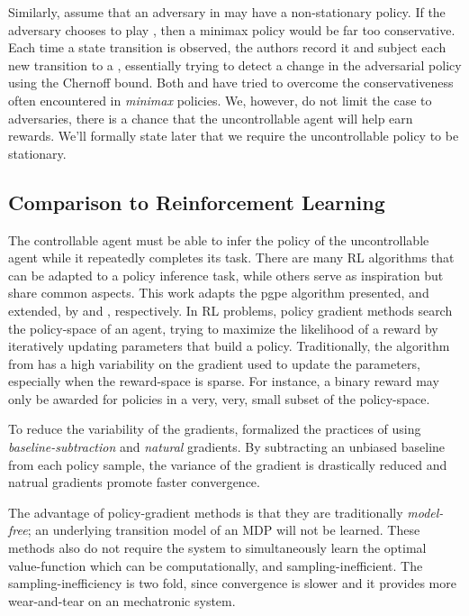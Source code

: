     Similarly, \cite{lim2013reinforcement} assume that an adversary in  may have a non-stationary policy. If
    the adversary chooses to play , then a minimax policy would be far too conservative. Each
    time a state transition is observed, the authors record it and subject each new transition to a
    , essentially trying to detect a change in the adversarial policy using the
    Chernoff bound. Both \cite{lim2013reinforcement} and \cite{bertuccelli2012robust} have tried to overcome the
    conservativeness often encountered in \textit{minimax} policies. We, however, do not limit the case to adversaries,
    there is a chance that the uncontrollable agent will help earn rewards. We'll formally state later that we require
    the uncontrollable policy to be stationary.

\subsection{Comparison to Reinforcement Learning}
    The controllable agent must be able to infer the policy of the uncontrollable agent while it repeatedly completes
    its task. There are many \ac{RL} algorithms that can be adapted to a policy inference task, while others serve as
    inspiration but share common aspects. This work adapts the \ac{pgpe} algorithm presented, and extended, by
    \cite{sehnke2010parameter} and \cite{tangkaratt2014model}, respectively. In \ac{RL} problems, policy gradient
    methods search the policy-space of an agent, trying to maximize the likelihood of a reward by iteratively updating
    parameters that build a policy. Traditionally, the \reinforce algorithm from \cite{williams1992simple} has a high
    variability on the gradient used to update the parameters, especially when the reward-space is sparse. For instance,
    a binary reward may only be awarded for policies in a very, very, small subset of the policy-space.

    To reduce the variability of the gradients, \cite{peters2008reinforcement} formalized the practices of using
    \textit{baseline-subtraction} and \textit{natural} gradients. By subtracting an unbiased baseline from each policy
    sample, the variance of the gradient is drastically reduced and natrual gradients promote faster convergence.

    The advantage of policy-gradient methods is that they are traditionally \textit{model-free}; an underlying
    transition model of an \ac{MDP} will not be learned. These methods also do not require the system to simultaneously
    learn the optimal value-function which can be computationally, and sampling-inefficient. The sampling-inefficiency
    is two fold, since convergence is slower and it provides more wear-and-tear on an mechatronic system.

